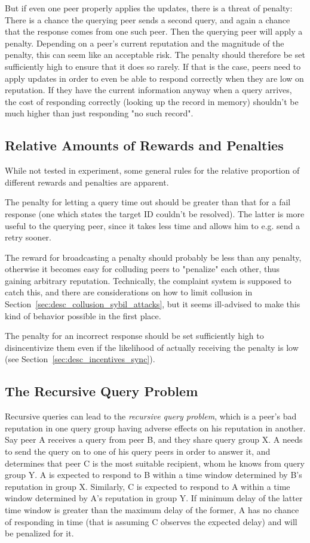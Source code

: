 But if even one peer properly applies the updates, there is a threat of penalty:
There is a chance the querying peer sends a second query, and again a chance
that the response comes from one such peer. Then the querying peer will apply a
penalty. Depending on a peer's current reputation and the magnitude of the
penalty, this can seem like an acceptable risk. The penalty should therefore be
set sufficiently high to ensure that it does so rarely. If that is the case,
peers need to apply updates in order to even be able to respond correctly when
they are low on reputation. If they have the current information anyway when a
query arrives, the cost of responding correctly (looking up the record in
memory) shouldn't be much higher than just responding "no such record".

\subsection{Relative Amounts of Rewards and Penalties}
While not tested in experiment, some general rules for the relative proportion
of different rewards and penalties are apparent.

The penalty for letting a query time out should be greater than that for a fail
response (one which states the target ID couldn't be resolved). The latter is
more useful to the querying peer, since it takes less time and allows him to
e.g. send a retry sooner.

The reward for broadcasting a penalty should probably be less than any penalty,
otherwise it becomes easy for colluding peers to "penalize" each other, thus
gaining arbitrary reputation. Technically, the complaint system is supposed to
catch this, and there are considerations on how to limit collusion in
Section~\ref{sec:desc_collusion_sybil_attacks}, but it seems ill-advised to make
this kind of behavior possible in the first place.

The penalty for an incorrect response should be set sufficiently high to
disincentivize them even if the likelihood of actually receiving the penalty is
low (see Section~\ref{sec:desc_incentives_sync}).

\subsection{The Recursive Query Problem}
\label{sec:desc_rec_query_prob}
Recursive queries can lead to the \emph{recursive query problem}, which is a
peer's bad reputation in one query group having adverse effects on his
reputation in another. Say peer A receives a query from peer B, and they share
query group X. A needs to send the query on to one of his query peers in order
to answer it, and determines that peer C is the most suitable recipient, whom he
knows from query group Y. A is expected to respond to B within a time window
determined by B's reputation in group X. Similarly, C is expected to respond to
A within a time window determined by A's reputation in group Y. If minimum delay
of the latter time window is greater than the maximum delay of the former, A has
no chance of responding in time (that is assuming C observes the expected delay)
and will be penalized for it.

